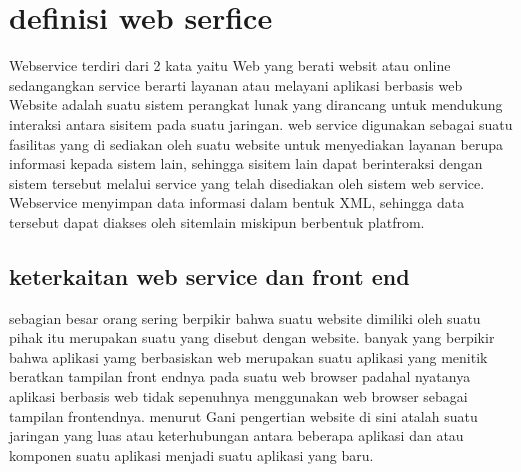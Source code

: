 \section{definisi web serfice }
Webservice terdiri dari 2 kata yaitu Web yang berati websit atau online 
sedangangkan service berarti layanan atau melayani aplikasi berbasis web 
Website adalah suatu sistem perangkat lunak yang dirancang untuk mendukung interaksi antara sisitem pada suatu jaringan.
web service digunakan sebagai suatu fasilitas yang di sediakan oleh suatu website untuk menyediakan layanan berupa informasi kepada 
sistem lain, sehingga sisitem lain dapat berinteraksi dengan sistem tersebut melalui service yang telah disediakan oleh sistem web service.
Webservice menyimpan data informasi dalam bentuk XML, sehingga data tersebut dapat diakses oleh sitemlain miskipun berbentuk platfrom. 
\subsection{keterkaitan web service dan front end }
sebagian besar orang sering berpikir bahwa suatu website dimiliki oleh suatu pihak 
itu merupakan suatu yang disebut dengan website. banyak yang berpikir bahwa aplikasi yamg berbasiskan 
web merupakan suatu aplikasi yang menitik beratkan tampilan front endnya pada suatu web browser 
padahal nyatanya aplikasi berbasis web tidak sepenuhnya menggunakan web browser sebagai tampilan 
frontendnya. menurut Gani pengertian website di sini atalah suatu jaringan yang luas atau keterhubungan 
antara beberapa aplikasi dan atau komponen suatu aplikasi menjadi suatu aplikasi yang baru.

